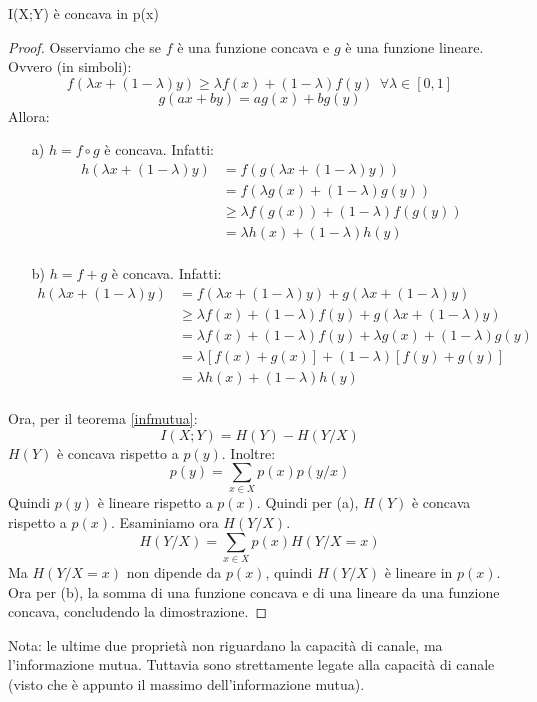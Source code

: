 \begin{osservazione}
\mbox{}

 I(X;Y) è concava in p(x)
\begin{proof}
\mbox{}

 \noindent
 Osserviamo che se $f$ è una funzione concava e $g$ è una funzione lineare. Ovvero (in simboli):
 \[
  f(\lambda x+(1-\lambda)y) \ge \lambda f(x)+ (1-\lambda) f(y) \ \ \forall \lambda \in [0,1]
 \]
 \[
  g(ax+by)=ag(x)+bg(y)
 \] 
  Allora:
  \begin{itemize}
   \item[a)] $h=f \circ g$ è concava. Infatti:
              \[\begin{split}
              h(\lambda x + (1-\lambda)y)&=f(g(\lambda x + (1-\lambda)y)) \\
              &=f(\lambda g(x) + (1-\lambda)g(y)) \\
              & \ge \lambda f(g(x)) + (1-\lambda)f(g(y)) \\
              &=\lambda h(x) + (1-\lambda)h(y) \\
               \end{split}
             \]

   \item[b)] $h=f+g$ è concava. Infatti:
              \[\begin{split}
                h(\lambda x + (1-\lambda)y)&=f(\lambda x + (1-\lambda)y)+g(\lambda x + (1-\lambda)y) \\
                &\ge \lambda f(x) + (1-\lambda)f(y)+g(\lambda x + (1-\lambda)y) \\
                &=\lambda f(x) + (1-\lambda)f(y)+ \lambda g(x) + (1-\lambda)g(y) \\
                &=\lambda[f(x)+g(x)] + (1-\lambda)[f(y)+g(y)] \\
                &=\lambda h(x) + (1-\lambda)h(y) \\
               \end{split}
              \]

  \end{itemize}
  Ora, per il teorema \ref{infmutua}:
  \[
   I(X;Y)=H(Y)-H(Y/X)
  \]
  $H(Y)$ è concava rispetto a $p(y)$. Inoltre:
  \[
   p(y)=\sum_{x \in X}p(x)p(y/x)
  \]
   Quindi $p(y)$ è lineare rispetto a $p(x)$. Quindi per (a), $H(Y)$ è concava rispetto a $p(x)$.
  Esaminiamo ora $H(Y/X)$.
  \[
   H(Y/X)=\sum_{x \in X} p(x)H(Y/X=x)
  \]
   Ma $H(Y/X=x)$ non dipende da $p(x)$, quindi $H(Y/X)$ è lineare in $p(x)$.
   Ora per (b), la somma di una funzione concava e di una lineare da una funzione concava, concludendo la dimostrazione.
\end{proof}
\end{osservazione}
Nota: le ultime due proprietà non riguardano la capacità di canale, ma l'informazione mutua. Tuttavia sono strettamente legate alla 
capacità di canale (visto che è appunto il massimo dell'informazione mutua).

